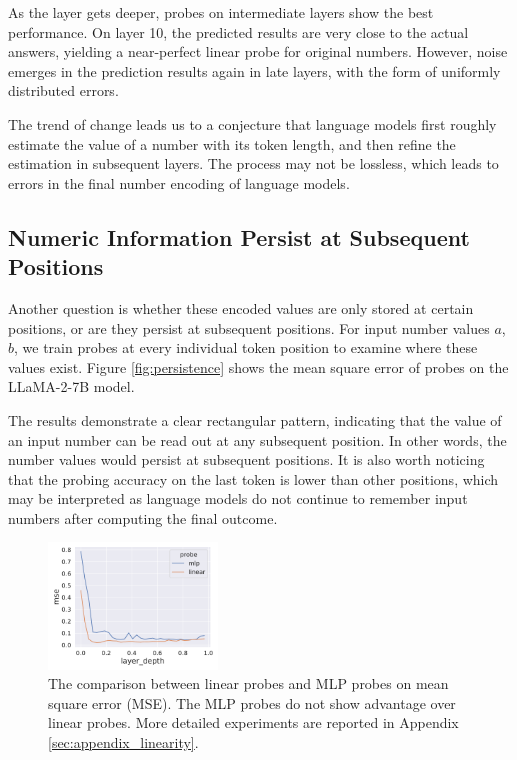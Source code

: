 \documentclass[11pt]{article}
\begin{document}
As the layer gets deeper, probes on intermediate layers show the best performance.
On layer 10, the predicted results are very close to the actual answers, yielding a near-perfect linear probe for original numbers.
However, noise emerges in the prediction results again in late layers, with the form of uniformly distributed errors.

The trend of change leads us to a conjecture that language models first roughly estimate the value of a number with its token length, and then refine the estimation in subsequent layers.
The process may not be lossless, which leads to errors in the final number encoding of language models.

\subsection{Numeric Information Persist at Subsequent Positions}
\label{ssec:persistence}
Another question is whether these encoded values are only stored at certain positions, or are they persist at subsequent positions.
For input number values $a$, $b$, we train probes at every individual token position to examine where these values exist.
Figure \ref{fig:persistence} shows the mean square error of probes on the LLaMA-2-7B model.

The results demonstrate a clear rectangular pattern, indicating that the value of an input number can be read out at any subsequent position.
In other words, the number values would persist at subsequent positions.
It is also worth noticing that the probing accuracy on the last token is lower than other positions, which may be interpreted as language models do not continue to remember input numbers after computing the final outcome.

\begin{figure}[ht]
    \centering
    \includegraphics[width=0.4\textwidth]{figures/linearity/linear_mse_trend.pdf}
    \caption{The comparison between linear probes and MLP probes on mean square error (MSE). The MLP probes do not show advantage over linear probes. More detailed experiments are reported in Appendix \ref{sec:appendix_linearity}.}
    \label{fig:linear}
\end{figure}
\end{document}
